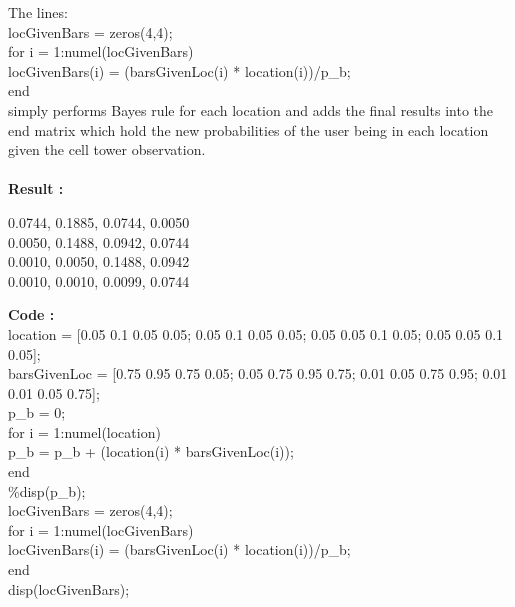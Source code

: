 \documentclass{report}
\begin{document}
		The lines:\\
		\indent locGivenBars = zeros(4,4);\\
		\indent for i = 1:numel(locGivenBars)\\
		\indent \indent locGivenBars(i) = (barsGivenLoc(i) * location(i))/p\_b;\\
		\indent end\\
		simply performs Bayes rule for each location and adds the final results into the end matrix which hold the new probabilities of the user being in each location given the cell tower observation.\\\\
		\textbf{Result :}
		
		\begin{center}
			0.0744,     0.1885,     0.0744,     0.0050\\
			0.0050,     0.1488,     0.0942,     0.0744\\
			0.0010,     0.0050,     0.1488,     0.0942\\
			0.0010,     0.0010,     0.0099,     0.0744\\
		\end{center}
	
		\textbf{Code :}\\
		\indent location = [0.05 0.1 0.05 0.05; 0.05 0.1 0.05 0.05; 0.05 0.05 0.1 0.05; 0.05 0.05 0.1 0.05];\\
		\indent barsGivenLoc = [0.75 0.95 0.75 0.05; 0.05 0.75 0.95 0.75; 0.01 0.05 0.75 0.95; 0.01 0.01 0.05 0.75];\\
		\indent	p\_b = 0;\\
		\indent for i = 1:numel(location)\\
		\indent \indent p\_b = p\_b + (location(i) * barsGivenLoc(i));\\
		\indent end\\
		\indent \%disp(p\_b);\\
		\indent locGivenBars = zeros(4,4);\\
		\indent for i = 1:numel(locGivenBars)\\
		\indent \indent locGivenBars(i) = (barsGivenLoc(i) * location(i))/p\_b;\\
		\indent end\\
		\indent disp(locGivenBars);\\
		
	
	
		
		
\end{document}
